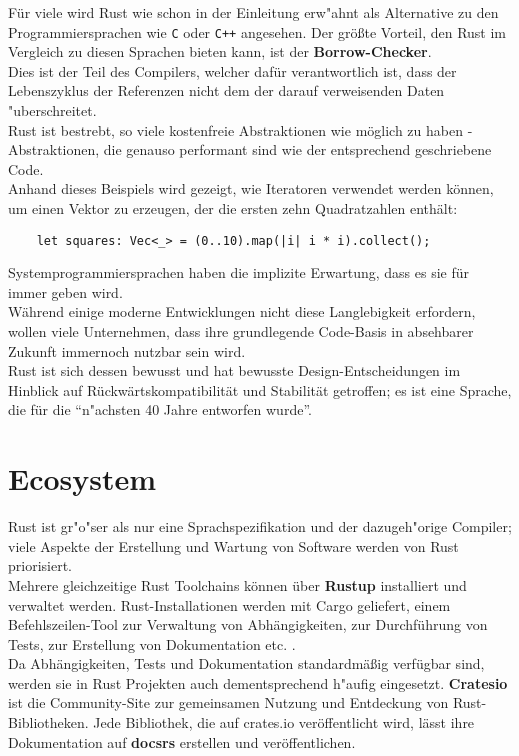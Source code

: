 Für viele wird Rust wie schon  in der Einleitung erw"ahnt als Alternative zu den Programmiersprachen wie \texttt{C} oder \texttt{C++} angesehen. Der größte Vorteil, den Rust im Vergleich zu diesen Sprachen bieten kann, ist der \textbf{Borrow-Checker}.\\
Dies ist der Teil des Compilers, welcher dafür verantwortlich ist, dass der Lebenszyklus der Referenzen nicht dem der darauf verweisenden Daten "uberschreitet.\\
Rust ist bestrebt, so viele kostenfreie Abstraktionen wie möglich zu haben - Abstraktionen, die genauso performant sind wie der entsprechend geschriebene Code.\\

Anhand dieses Beispiels wird gezeigt, wie Iteratoren verwendet werden können, um einen Vektor zu erzeugen, der die ersten zehn Quadratzahlen enthält:

\begin{verbatim}
    let squares: Vec<_> = (0..10).map(|i| i * i).collect();
\end{verbatim}

Systemprogrammiersprachen haben die implizite Erwartung, dass es sie für immer geben wird. \\
Während einige moderne Entwicklungen nicht diese Langlebigkeit erfordern, wollen viele Unternehmen, dass ihre grundlegende Code-Basis in absehbarer Zukunft immernoch nutzbar sein wird.\\
Rust ist sich dessen bewusst und hat bewusste Design-Entscheidungen im Hinblick auf Rückwärtskompatibilität und Stabilität getroffen; es ist eine Sprache, die für die \enquote{n"achsten 40 Jahre entworfen wurde}.

\section{Ecosystem}
Rust ist gr"o"ser als nur eine Sprachspezifikation und der dazugeh"orige Compiler; viele Aspekte der Erstellung und Wartung von Software werden von Rust priorisiert.\\
Mehrere gleichzeitige Rust Toolchains können über \textbf{Rustup} \autocite{rustup} installiert und verwaltet werden. Rust-Installationen werden mit Cargo geliefert, einem Befehlszeilen-Tool zur Verwaltung von Abhängigkeiten, zur Durchführung von Tests, zur Erstellung von Dokumentation etc. .\\
Da Abhängigkeiten, Tests und Dokumentation standardmäßig verfügbar sind, werden sie in Rust Projekten auch dementsprechend h"aufig eingesetzt. \textbf{Cratesio} \autocite{cratesio} ist die Community-Site zur gemeinsamen Nutzung und Entdeckung von Rust-Bibliotheken. Jede Bibliothek, die auf crates.io veröffentlicht wird, lässt ihre Dokumentation auf \textbf{docsrs} \autocite{docsrs} erstellen und veröffentlichen.\\

